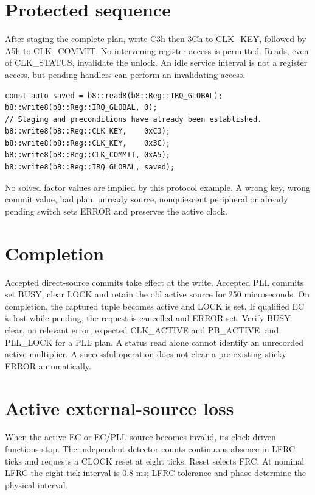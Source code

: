 \documentclass[10pt]{article}
\begin{document}
\section*{Protected sequence}
After staging the complete plan, write C3h then 3Ch to CLK\_KEY, followed by A5h to CLK\_COMMIT. No intervening register access is permitted. Reads, even of CLK\_STATUS, invalidate the unlock. An idle service interval is not a register access, but pending handlers can perform an invalidating access.
\begin{verbatim}
const auto saved = b8::read8(b8::Reg::IRQ_GLOBAL);
b8::write8(b8::Reg::IRQ_GLOBAL, 0);
// Staging and preconditions have already been established.
b8::write8(b8::Reg::CLK_KEY,    0xC3);
b8::write8(b8::Reg::CLK_KEY,    0x3C);
b8::write8(b8::Reg::CLK_COMMIT, 0xA5);
b8::write8(b8::Reg::IRQ_GLOBAL, saved);
\end{verbatim}
No solved factor values are implied by this protocol example. A wrong key, wrong commit value, bad plan, unready source, nonquiescent peripheral or already pending switch sets ERROR and preserves the active clock.
\section*{Completion}
Accepted direct-source commits take effect at the write. Accepted PLL commits set BUSY, clear LOCK and retain the old active source for 250 microseconds. On completion, the captured tuple becomes active and LOCK is set. If qualified EC is lost while pending, the request is cancelled and ERROR set.
Verify BUSY clear, no relevant error, expected CLK\_ACTIVE and PB\_ACTIVE, and PLL\_LOCK for a PLL plan. A status read alone cannot identify an unrecorded active multiplier. A successful operation does not clear a pre-existing sticky ERROR automatically.

\newpage
{}

\section*{Active external-source loss}
When the active EC or EC/PLL source becomes invalid, its clock-driven functions stop. The independent detector counts continuous absence in LFRC ticks and requests a CLOCK reset at eight ticks. Reset selects FRC. At nominal LFRC the eight-tick interval is 0.8 ms; LFRC tolerance and phase determine the physical interval.
\end{document}
